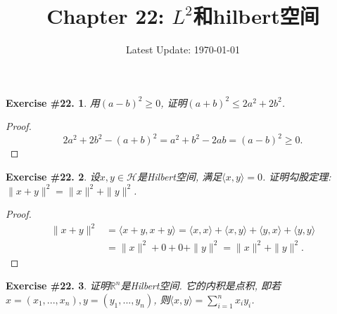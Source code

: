 \documentclass[UTF8, a4paper]{article}
\title{Chapter 22: \(L^2\)和hilbert空间}
\author{}
\date{Latest Update: \today}
\newtheorem{exercise}{Exercise \#22.}
\begin{document}
\maketitle


\begin{framed}
\begin{exercise}
用\((a - b)^2 \geq 0\), 证明\((a+b)^2 \leq 2a^2 + 2b^2\).
\end{exercise}
\end{framed}

\begin{proof}
$$
2a^2 + 2b^2 - (a+b)^2 = a^2 + b^2 - 2ab = (a-b)^2 \geq 0.
$$
\end{proof}

\begin{framed}
\begin{exercise}
设\(x,y \in \mathcal{H}\)是Hilbert空间, 满足\(\langle x, y \rangle = 0\). 证明勾股定理: \(\|x + y\|^2 = \|x\|^2 + \|y\|^2\).
\end{exercise}
\end{framed}

\begin{proof}
$$
\begin{aligned}
\|x + y\|^2 &= \langle x + y, x + y \rangle = \langle x, x \rangle + \langle x, y \rangle + \langle y, x \rangle + \langle y, y \rangle \\
&= \|x\|^2 + 0 + 0 + \|y\|^2 = \|x\|^2 + \|y\|^2.
\end{aligned}
$$
\end{proof}



\begin{framed}
\begin{exercise}
证明\(\mathbb{R}^n\)是Hilbert空间. 它的内积是点积, 即若\(x = (x_1, ..., x_n), y = (y_1, ..., y_n)\), 则\(\langle x, y \rangle = \sum_{i=1}^{n}x_iy_i\).
\end{exercise}
\end{framed}
\end{document}
